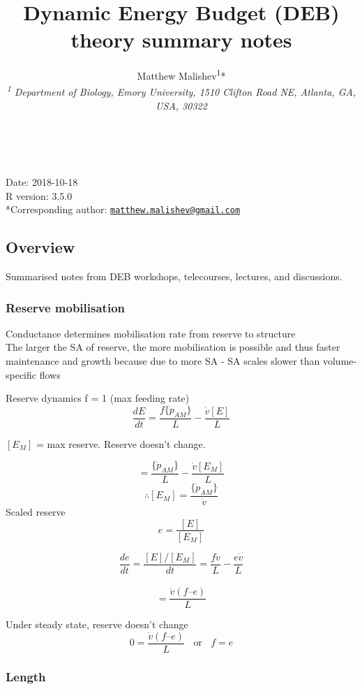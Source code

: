 \documentclass[10,portrait]{article}
\title{Dynamic Energy Budget (DEB) theory summary notes}
\author{Matthew
Malishev\textsuperscript{1}*\\[2\baselineskip]\emph{\textsuperscript{1}
Department of Biology, Emory University, 1510 Clifton Road NE, Atlanta,
GA, USA, 30322}}
\date{}
\begin{document}
\maketitle

{
\hypersetup{linkcolor=black}
\setcounter{tocdepth}{4}
\tableofcontents
}
~

Date: 2018-10-18\\
R version: 3.5.0\\
*Corresponding author:
\href{mailto:matthew.malishev@gmail.com}{\nolinkurl{matthew.malishev@gmail.com}}

\newpage  

\subsection{Overview}\label{overview}

Summarised notes from DEB workshops, telecourses, lectures, and
discussions.

\subsubsection{Reserve mobilisation}\label{reserve-mobilisation}

Conductance determines mobilisation rate from reserve to structure\\
The larger the SA of reserve, the more mobilisation is possible and thus
faster maintenance and growth because due to more SA - SA scales slower
than volume-specific flows

Reserve dynamics f = 1 (max feeding rate)\\
\[
\frac
  {d E}
  {d t}  
  = \frac
  {f\{\dot{p}_{AM}\}}
  {L}  
  - \frac  
  {\dot{v}[E]}  
  {L}   
\]

\([E_{M}]\) = max reserve. Reserve doesn't change.

\[
= \frac
  {\{\dot{p}_{AM}\}}
  {L} - 
  \frac
  {\dot{v}[E_{M}]}
  {L}    
\] \[
\therefore 
[E_{M}]
= \frac
  {\{\dot{p}_{AM}\}}
  {\dot{v}}
\] Scaled reserve \[
e =
\frac
{[E]}
{[E_{M}]}  
\]

\[
\frac
{de}
{dt}
= \frac
{[E] /[E_{M}]}
{dt} 
= \frac
{f\dot{v}}
{L}  - 
\frac
{e\dot{v}}
{L}     
\]\\
\[
= \frac
{\dot{v} (f – e)}
{L} 
\]

Under steady state, reserve doesn't change\\
\[
0 =
\frac
{\dot{v} (f – e)}
{L}
\ \ \ \
\text{or}
\ \ \ \ f = e
\]

\subsubsection{Length}\label{length}
\end{document}
